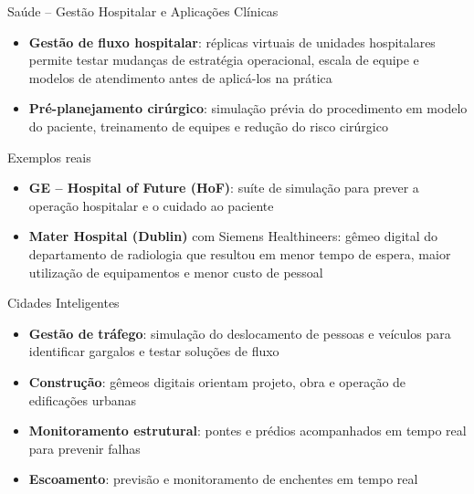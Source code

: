 \documentclass[aspectratio=169,xcolor=dvipsnames]{beamer}
\begin{document}
\begin{frame}{Saúde -- Gestão Hospitalar e Aplicações Clínicas}
    \begin{itemize}
        \item \textbf{Gestão de fluxo hospitalar}: réplicas virtuais de unidades hospitalares permite testar mudanças de estratégia operacional, escala de equipe e modelos de atendimento antes de aplicá-los na prática
        \item \textbf{Pré-planejamento cirúrgico}: simulação prévia do procedimento em modelo do paciente, treinamento de equipes e redução do risco cirúrgico
    \end{itemize}
    \begin{exampleblock}{Exemplos reais}
        \begin{itemize}
            \item \textbf{GE -- Hospital of Future (HoF)}: suíte de simulação para prever a operação hospitalar e o cuidado ao paciente
            \item \textbf{Mater Hospital (Dublin)} com Siemens Healthineers: gêmeo digital do departamento de radiologia que resultou em menor tempo de espera, maior utilização de equipamentos e menor custo de pessoal
        \end{itemize}
    \end{exampleblock}
\end{frame}
\begin{frame}{Cidades Inteligentes}
    \begin{itemize}
        \item \textbf{Gestão de tráfego}: simulação do deslocamento de pessoas e veículos para identificar gargalos e testar soluções de fluxo
        \item \textbf{Construção}: gêmeos digitais orientam projeto, obra e operação de edificações urbanas
        \item \textbf{Monitoramento estrutural}: pontes e prédios acompanhados em tempo real para prevenir falhas
        \item \textbf{Escoamento}: previsão e monitoramento de enchentes em tempo real
    \end{itemize}
\end{frame}
\end{document}
